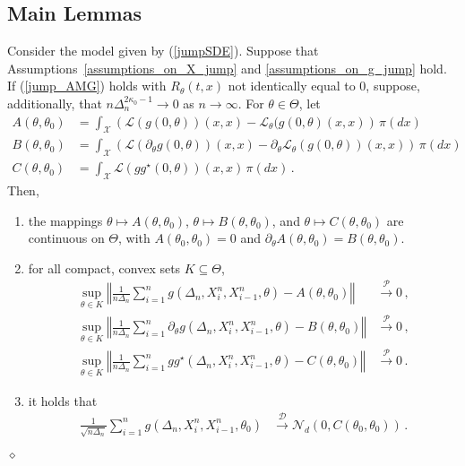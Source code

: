\documentclass[11pt,a4paper]{article}
\newcommand{\xtl}{{X^n_{i-1}}}
\newcommand{\xtr}{X^n_i}
\newcommand{\thetan}{{\theta_0}}
\newcommand{\dd}{{\mathcal{D}}}
\renewcommand{\ll}{{\mathcal{L}}}
\newcommand{\nn}{{\mathcal{N}}}
\newcommand{\pp}{{\mathcal{P}}}
\newcommand{\xx}{{\mathcal{X}}}
\newcommand{\dqed}{{\leavevmode \unskip \penalty9999 \hbox{} \nobreak \hfill \quad \hbox{$\diamond$}}}
\numberwithin{equation}{section}
\numberwithin{theorem}{section}
\begin{document}
\subsection{Main Lemmas}\label{sec:main_lemma_jump}
\begin{lemma} 
Consider the model given by (\ref{jumpSDE}). Suppose that Assumptions~\ref{assumptions_on_X_jump} and \ref{assumptions_on_g_jump} hold. If (\ref{jump_AMG}) holds with $R_\theta(t,x)$ not identically equal to $0$, suppose, additionally, that $n\Delta_n^{2{\kappa_0}-1} \to 0$ as $n\to \infty$. For $\theta \in \Theta$, let 
\begin{align*}
A(\theta, \thetan) &= \int_\xx \left( \ll( g(0, \theta) )(x,x) - \ll_{\theta}( g(0, \theta) (x,x) \right)\, \pi(dx)\\
B(\theta, \thetan) &= \int_\xx\left(  \ll(\partial_\theta g(0, \theta))(x,x) - \partial_\theta   \ll_\theta(g(0,\theta))(x,x) \right)\, \pi(dx)\\
C(\theta, \thetan) &= \int_\xx \ll(gg^\star (0,\theta))(x,x)\, \pi(dx)\,.
\end{align*}
Then,
\begin{enumerate}[label=(\roman{*}),ref=(\roman{*})]
\item \label{ucon1} the mappings $\theta \mapsto A(\theta, \thetan)$, $\theta \mapsto B(\theta, \thetan)$, and $\theta \mapsto C(\theta, \thetan)$ are continuous on $\Theta$, with $A(\thetan, \thetan)=0$ and $\partial_\theta A(\theta, \thetan) = B(\theta, \thetan)$.
%
\item \label{ucon3} for all compact, convex sets $K\subseteq \Theta$,
\begin{align}
\sup_{\theta \in K} \left\Vert \frac{1}{n\Delta_n}\sum_{i=1}^n g(\Delta_n, \xtr, \xtl, \theta)   - A(\theta,\thetan)\right\Vert &\overset{\pp}{\longrightarrow} 0\,,\nonumber \\ 
\sup_{\theta \in K} \left\Vert \frac{1}{n\Delta_n}\sum_{i=1}^n \partial_\theta g (\Delta_n, \xtr, \xtl, \theta) -B(\theta, \thetan)\right\Vert&\overset{\pp}{\longrightarrow} 0\,, \label{convmainP2}\\
\sup_{\theta \in K} \left\Vert \frac{1}{n\Delta_n}\sum_{i=1}^n gg^\star(\Delta_n, \xtr, \xtl, \theta) - C(\theta,\thetan)\right\Vert &\overset{\pp}{\longrightarrow} 0\,. \nonumber
\end{align}
%
\item \label{ucon2} it holds that
\begin{align*}
  \frac{1}{\sqrt{n\Delta_n}} \sum_{i=1}^n g(\Delta_n,\xtr,\xtl, \thetan)
  &\overset{\dd}{\longrightarrow} \nn_d(0,C(\thetan,\thetan))\,.
\end{align*}
\end{enumerate}\dqed
\label{uconvP}
\end{lemma}
\end{document}
